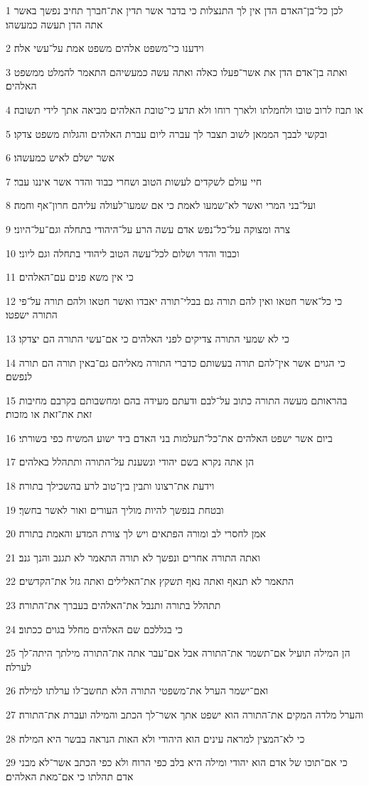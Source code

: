 \par 1 לכן כל־בן־האדם הדן אין לך התנצלות כי בדבר אשר תדין את־חברך תחיב נפשך באשר אתה הדן תעשה כמעשהו׃
\par 2 וידענו כי־משפט אלהים משפט אמת על־עשי אלה׃
\par 3 ואתה בן־אדם הדן את אשר־פעלו כאלה ואתה עשה כמעשיהם התאמר להמלט ממשפט האלהים׃
\par 4 או תבוז לרוב טובו ולחמלתו ולארך רוחו ולא תדע כי־טובת האלהים מביאה אתך לידי תשובה׃
\par 5 ובקשי לבבך הממאן לשוב תצבר לך עברה ליום עברת האלהים והגלות משפט צדקו׃
\par 6 אשר ישלם לאיש כמעשהו׃
\par 7 חיי עולם לשקדים לעשות הטוב ושחרי כבוד והדר אשר איננו עבר׃
\par 8 ועל־בני המרי ואשר לא־שמעו לאמת כי אם שמעו־לעולה עליהם חרון־אף וחמה׃
\par 9 צרה ומצוקה על־כל־נפש אדם עשה הרע על־היהודי בתחלה וגם־על־היוני׃
\par 10 וכבוד והדר ושלום לכל־עשה הטוב ליהודי בתחלה וגם ליוני׃
\par 11 כי אין משא פנים עם־האלהים׃
\par 12 כי כל־אשר חטאו ואין להם תורה גם בבלי־תורה יאבדו ואשר חטאו ולהם תורה על־פי התורה ישפטו׃
\par 13 כי לא שמעי התורה צדיקים לפני האלהים כי אם־עשי התורה הם יצדקו׃
\par 14 כי הגוים אשר אין־להם תורה בעשותם כדברי התורה מאליהם גם־באין תורה הם תורה לנפשם׃
\par 15 בהראותם מעשה התורה כתוב על־לבם ודעתם מעידה בהם ומחשבותם בקרבם מחיבות זאת את־זאת או מזכות׃
\par 16 ביום אשר ישפט האלהים את־כל־תעלמות בני האדם ביד ישוע המשיח כפי בשורתי׃
\par 17 הן אתה נקרא בשם יהודי ונשענת על־התורה ותתהלל באלהים׃
\par 18 וידעת את־רצונו ותבין בין־טוב לרע בהשכילך בתורה׃
\par 19 ובטחת בנפשך להיות מוליך העורים ואור לאשר בחשך׃
\par 20 אמן לחסרי לב ומורה הפתאים ויש לך צורת המדע והאמת בתורה׃
\par 21 ואתה התורה אחרים ונפשך לא תורה התאמר לא תגנב והנך גנב׃
\par 22 התאמר לא תנאף ואתה נאף תשקץ את־האלילים ואתה גזל את־הקדשים׃
\par 23 תתהלל בתורה ותנבל את־האלהים בעברך את־התורה׃
\par 24 כי בגללכם שם האלהים מחלל בגוים ככתוב׃
\par 25 הן המילה תועיל אם־תשמר את־התורה אבל אם־עבר אתה את־התורה מילתך היתה־לך לערלה׃
\par 26 ואם־ישמר הערל את־משפטי התורה הלא תחשב־לו ערלתו למילה׃
\par 27 והערל מלדה המקים את־התורה הוא ישפט אתך אשר־לך הכתב והמילה ועברת את־התורה׃
\par 28 כי לא־המצין למראה עינים הוא היהודי ולא האות הנראה בבשר היא המילה׃
\par 29 כי אם־תוכו של אדם הוא יהודי ומילה היא בלב כפי הרוח ולא כפי הכתב אשר־לא מבני אדם תהלתו כי אם־מאת האלהים׃

